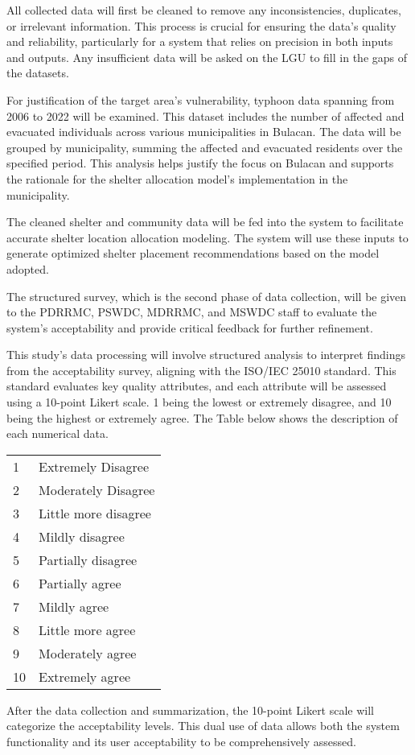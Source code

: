 All collected data will first be cleaned to remove any inconsistencies, duplicates, or irrelevant information. This process is crucial for ensuring the data’s quality and reliability, particularly for a system that relies on precision in both inputs and outputs. Any insufficient data will be asked on the LGU to fill in the gaps of the datasets. 

For justification of the target area’s vulnerability, typhoon data spanning from 2006 to 2022 will be examined. This dataset includes the number of affected and evacuated individuals across various municipalities in Bulacan. The data will be grouped by municipality, summing the affected and evacuated residents over the specified period. This analysis helps justify the focus on Bulacan and supports the rationale for the shelter allocation model’s implementation in the municipality.

The cleaned shelter and community data will be fed into the system to facilitate accurate shelter location allocation modeling. The system will use these inputs to generate optimized shelter placement recommendations based on the model adopted.

The structured survey, which is the second phase of data collection, will be given to the PDRRMC, PSWDC, MDRRMC, and MSWDC staff to evaluate the system's acceptability and provide critical feedback for further refinement.

This study's data processing will involve structured analysis to interpret findings from the acceptability survey, aligning with the ISO/IEC 25010 standard. This standard evaluates key quality attributes, and each attribute will be assessed using a 10-point Likert scale. 1 being the lowest or extremely disagree, and 10 being the highest or extremely agree. The Table below shows the description of each numerical data.

\begin{table}[]
	\begin{tabular}{ll}
		1  & Extremely Disagree   \\
		2  & Moderately Disagree  \\
		3  & Little more disagree \\
		4  & Mildly disagree      \\
		5  & Partially disagree   \\
		6  & Partially agree      \\
		7  & Mildly agree         \\
		8  & Little more agree    \\
		9  & Moderately agree     \\
		10 & Extremely agree     
	\end{tabular}
\end{table}

After the data collection and summarization, the 10-point Likert scale will categorize the acceptability levels. This dual use of data allows both the system functionality and its user acceptability to be comprehensively assessed. 
